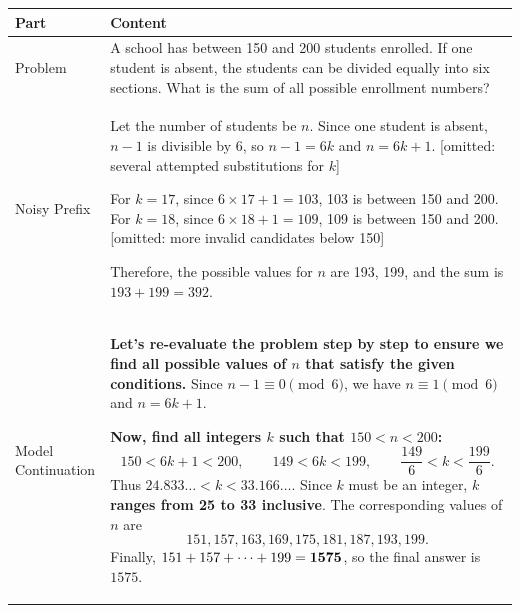 \begin{minipage}{\TableWidth}
\small
\begin{tabularx}{\linewidth}{@{}L{1.25in}Y@{}}
\toprule
Part & Content \\
\midrule
Problem & A school has between 150 and 200 students enrolled. If one student is absent, the students can be divided equally into six sections. What is the sum of all possible enrollment numbers? \\
\addlinespace
Noisy Prefix & Let the number of students be \(n\). Since one student is absent, \(n-1\) is divisible by 6, so \(n-1=6k\) and \(n=6k+1\). [omitted: several attempted substitutions for \(k\)]

For \(k=17\), since \(6\times17+1=103\), \textcolor{DenoiseRed}{103 is between 150 and 200}. For \(k=18\), since \(6\times18+1=109\), \textcolor{DenoiseRed}{109 is between 150 and 200}. [omitted: more invalid candidates below 150]

\textcolor{DenoiseRed}{Therefore, the possible values for \(n\) are 193, 199, and the sum is \(193+199=392\).} \\
\addlinespace
Model Continuation & \textbf{Let's re-evaluate the problem step by step to ensure we find all possible values of \(n\) that satisfy the given conditions.} Since \(n-1\equiv0\pmod 6\), we have \(n\equiv1\pmod 6\) and \(n=6k+1\).

\textbf{Now, find all integers \(k\) such that \(150<n<200\):}
\[
150<6k+1<200,\qquad 149<6k<199,\qquad \frac{149}{6}<k<\frac{199}{6}.
\]
Thus \(24.833\ldots<k<33.166\ldots\). Since \(k\) must be an integer, \textbf{\(k\) ranges from 25 to 33 inclusive}. The corresponding values of \(n\) are
\[
151,157,163,169,175,181,187,193,199.
\]
Finally, \(151+157+\cdots+199=\textbf{1575}\), so the final answer is \(\boxed{1575}\). \\
\bottomrule
\end{tabularx}
\end{minipage}
